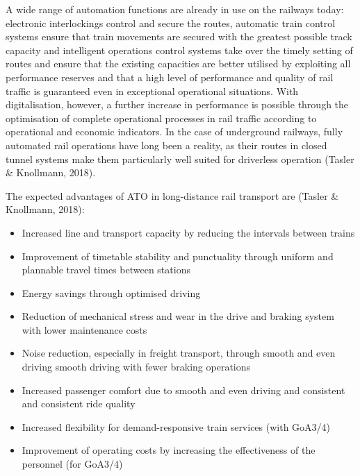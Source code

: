 \documentclass[
]{book}
\providecommand{\tightlist}{%
  \setlength{\itemsep}{0pt}\setlength{\parskip}{0pt}}
\begin{document}
A wide range of automation functions are already in use on the railways today: electronic interlockings control and secure the routes, automatic train control systems ensure that train movements are secured with the greatest possible track capacity and intelligent operations control systems take over the timely setting of routes and ensure that the existing capacities are better utilised by exploiting all performance reserves and that a high level of performance and quality of rail traffic is guaranteed even in exceptional operational situations. With digitalisation, however, a further increase in performance is possible through the optimisation of complete operational processes in rail traffic according to operational and economic indicators. In the case of underground railways, fully automated rail operations have long been a reality, as their routes in closed tunnel systems make them particularly well suited for driverless operation (Tasler \& Knollmann, 2018).

The expected advantages of ATO in long-distance rail transport are (Tasler \& Knollmann, 2018):

\begin{itemize}
\tightlist
\item
  Increased line and transport capacity by reducing the intervals between trains
\item
  Improvement of timetable stability and punctuality through uniform and plannable travel times between stations
\item
  Energy savings through optimised driving
\item
  Reduction of mechanical stress and wear in the drive and braking system with lower maintenance costs
\item
  Noise reduction, especially in freight transport, through smooth and even driving smooth driving with fewer braking operations
\item
  Increased passenger comfort due to smooth and even driving and consistent and consistent ride quality
\item
  Increased flexibility for demand-responsive train services (with GoA3/4)
\item
  Improvement of operating costs by increasing the effectiveness of the personnel (for GoA3/4)
\end{itemize}
\end{document}
